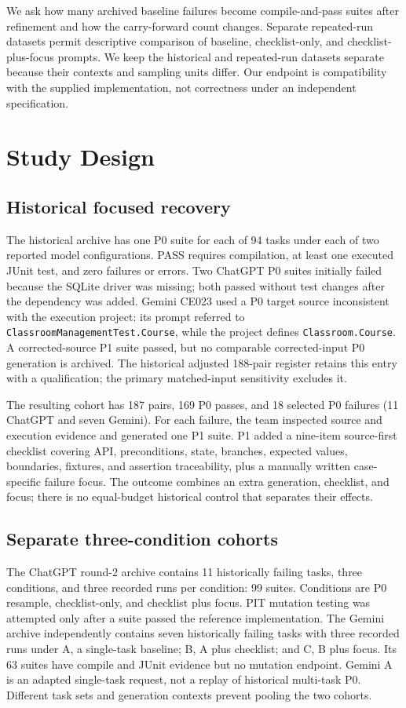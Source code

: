 \documentclass[conference]{IEEEtran}
\begin{document}
We ask how many archived baseline failures become compile-and-pass suites after refinement and how the carry-forward count changes. Separate repeated-run datasets permit descriptive comparison of baseline, checklist-only, and checklist-plus-focus prompts. We keep the historical and repeated-run datasets separate because their contexts and sampling units differ. Our endpoint is compatibility with the supplied implementation, not correctness under an independent specification.

\section{Study Design}
\subsection{Historical focused recovery}
The historical archive has one P0 suite for each of 94 tasks under each of two reported model configurations. PASS requires compilation, at least one executed JUnit test, and zero failures or errors. Two ChatGPT P0 suites initially failed because the SQLite driver was missing; both passed without test changes after the dependency was added. Gemini CE023 used a P0 target source inconsistent with the execution project: its prompt referred to \texttt{ClassroomManagementTest.Course}, while the project defines \texttt{Classroom.Course}. A corrected-source P1 suite passed, but no comparable corrected-input P0 generation is archived. The historical adjusted 188-pair register retains this entry with a qualification; the primary matched-input sensitivity excludes it.

The resulting cohort has 187 pairs, 169 P0 passes, and 18 selected P0 failures (11 ChatGPT and seven Gemini). For each failure, the team inspected source and execution evidence and generated one P1 suite. P1 added a nine-item source-first checklist covering API, preconditions, state, branches, expected values, boundaries, fixtures, and assertion traceability, plus a manually written case-specific failure focus. The outcome combines an extra generation, checklist, and focus; there is no equal-budget historical control that separates their effects.

\subsection{Separate three-condition cohorts}
The ChatGPT round-2 archive contains 11 historically failing tasks, three conditions, and three recorded runs per condition: 99 suites. Conditions are P0 resample, checklist-only, and checklist plus focus. PIT mutation testing was attempted only after a suite passed the reference implementation. The Gemini archive independently contains seven historically failing tasks with three recorded runs under A, a single-task baseline; B, A plus checklist; and C, B plus focus. Its 63 suites have compile and JUnit evidence but no mutation endpoint. Gemini A is an adapted single-task request, not a replay of historical multi-task P0. Different task sets and generation contexts prevent pooling the two cohorts.
\end{document}
